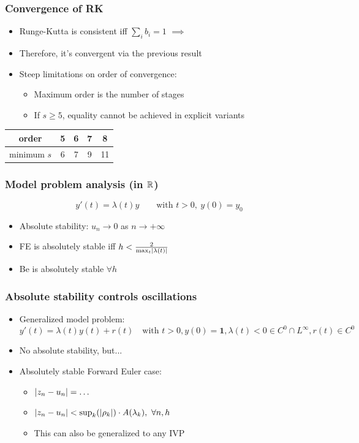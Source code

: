 \documentclass{beamer}
\begin{document}
\begin{frame} %
\frametitle{Convergence of RK}
	\begin{itemize}
		\item Runge-Kutta is consistent iff $\sum_i b_i = 1$ $\implies$
		\item Therefore, it's convergent via the previous result
		\item Steep limitations on order of convergence:
		\begin{itemize}
			\item Maximum order is the number of stages
			\item If $s \ge 5$, equality cannot be achieved in explicit variants
		\end{itemize}
	\end{itemize}
	\begin{tabular}{c|cccc}
		order & 5 & 6 & 7 & 8\\
		\hline
		minimum $s$ & 6 & 7 & 9 & 11 
	\end{tabular}
\end{frame}



\begin{frame} %
\frametitle{Model problem analysis (in $\mathbb R$)}
	$$ y'(t) = \lambda(t) y \qquad \text{with } t > 0, \ y(0) = y_0 $$
	\begin{itemize}
		\item Absolute stability: $u_n \to 0$ as $n \to +\infty$
		\item FE is absolutely stable iff $h < \frac{2}{\max_t \lvert\lambda(t)\rvert} $
		\item Be is absolutely stable $\forall h$
	\end{itemize}
\end{frame}


\begin{frame} %
\frametitle{Absolute stability controls oscillations}
\begin{itemize}
	\item Generalized model problem:
	$$ y'(t) = \lambda(t) y(t) + r(t) \quad \text{with } t > 0, y(0) = \boldsymbol 1,
	\lambda(t)<0 \in C^0 \cap L^\infty,  r(t) \in C^0 $$
	\item No absolute stability, but...
	\item Absolutely stable Forward Euler case:
	\begin{itemize}
		\item $\lvert z_n - u_n\rvert = \dots$ %
		\item $\lvert z_n - u_n\rvert < \sup_k(\lvert\rho_k\rvert) \cdot A(\lambda_k), \ \forall n,h$ %
		\item This can also be generalized to any IVP
	\end{itemize}
\end{itemize}
\end{frame}
\end{document}
